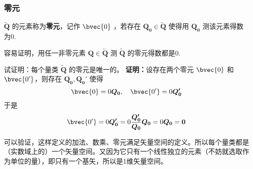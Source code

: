 \subsubsection{零元}
\begin{definition}{}
$\tilde{\boldsymbol{Q}}$ 的元素称为\textbf{零元}，记作 $\bvec{0}$ ，若存在 $\boldsymbol{Q_0}\in\tilde{\boldsymbol{Q}}$ 使得用 $\boldsymbol{Q_0}$ 测该元素得数为0.
\end{definition}
容易证明，用任一非零元素 $\boldsymbol{Q}\in\tilde{\boldsymbol{Q}}$ 测 $\tilde{\boldsymbol{Q}}$ 的零元得数都是0.
\begin{example}{}
试证明：每个量类 $\tilde{\boldsymbol{Q}}$ 的零元是唯一的。
\textbf{证明：}设存在两个零元 $\bvec{0}$ 和 $\bvec{0'}$，则存在 $\boldsymbol{Q_0},\boldsymbol{Q_0'}$ 使得 
\begin{equation}
\bvec{0}=0\boldsymbol{Q_0},\quad \bvec{0'}=0\boldsymbol{Q_0'}
\end{equation}
于是
\begin{equation}
\bvec{0'}=0\boldsymbol{Q_0'}=0\frac{\boldsymbol{Q_0'}}{\boldsymbol{Q_0}}\boldsymbol{Q_0}=0\boldsymbol{Q_0}=\boldsymbol{0}
\end{equation}
\end{example}
可以验证，这样定义的加法、数乘、零元满足矢量空间的定义。所以每个量类都是（实数域上的）一个矢量空间。又因为它只有一个线性独立的元素（不妨就选取作为单位的量），即只有一个基矢，所以是1维矢量空间。
